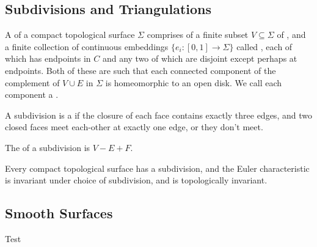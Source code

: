 \documentclass[a4paper, twocolumn]{article}
\begin{document}
\subsection{Subdivisions and Triangulations}

\begin{definition}
  A  of a compact topological surface $\Sigma$ comprises of a finite subset $V \subseteq \Sigma$ of , and a finite collection of continuous embeddings $\{e_i: [0, 1] \rightarrow \Sigma\}$ called , each of which has endpoints in $C$ and any two of which are disjoint except perhaps at endpoints. Both of these are such that each connected component of the complement of $V \cup E$ in $\Sigma$ is homeomorphic to an open disk. We call each component a . 
  
  A subdivision is a  if the closure of each face contains exactly three edges, and two closed faces meet each-other at exactly one edge, or they don't meet.
\end{definition}

\begin{definition}
  The  of a subdivision is $V - E + F$.
\end{definition}

\begin{theorem}
  Every compact topological surface has a subdivision, and the Euler characteristic is invariant under choice of subdivision, and is topologically invariant.
\end{theorem}

\subsection{Smooth Surfaces}

Test
\end{document}
